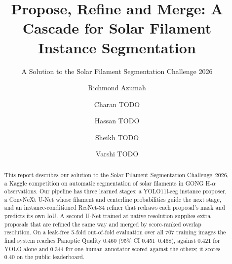 \documentclass[sigconf]{acmart}
\begin{document}
\title{Propose, Refine and Merge: A Cascade for Solar Filament Instance Segmentation}
\subtitle{A Solution to the Solar Filament Segmentation Challenge 2026} %


\author{Richmond Azumah}

\author{Charan TODO}

\author{Hassan TODO}

\author{Sheikh TODO}

\author{Varshi TODO}


\begin{abstract}
    This report describes our solution to the Solar Filament Segmentation Challenge~2026, a Kaggle competition on automatic segmentation of solar filaments in GONG H-$\alpha$ observations. Our pipeline has three learned stages:
    a YOLO11l-seg instance proposer, a ConvNeXt U-Net whose filament and centerline probabilities guide the
    next stage, and an instance-conditioned ResNet-34 refiner that redraws each proposal's mask and predicts
    its own IoU. A second U-Net trained at native resolution supplies extra proposals that are refined the
    same way and merged by score-ranked overlap resolution. On a leak-free 5-fold out-of-fold evaluation over
    all 707 training images the final system reaches Panoptic Quality 0.460 (95\% CI 0.451--0.468), against
    0.421 for YOLO alone and 0.344 for one human annotator scored against the others; it scores 0.40 on the
    public leaderboard.
\end{abstract}
\end{document}
